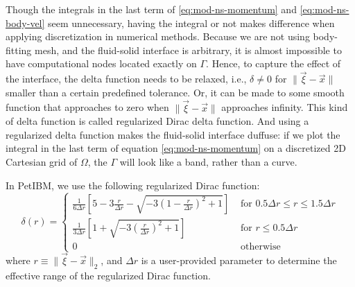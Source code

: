 Though the integrals in the last term of \eqref{eq:mod-ns-momentum} and \eqref{eq:mod-ns-body-vel} seem unnecessary, having the integral or not makes difference when applying discretization in numerical methods.
Because we are not using body-fitting mesh, and the fluid-solid interface is arbitrary, it is almost impossible to have computational nodes located exactly on $\Gamma$.
Hence, to capture the effect of the interface, the delta function needs to be relaxed, i.e., $\delta \ne 0$ for $\lVert \vec{\xi}-\vec{x} \rVert$ smaller than a certain predefined tolerance.
Or, it can be made to some smooth function that approaches to zero when $\lVert \vec{\xi}-\vec{x} \rVert$ approaches infinity.
This kind of delta function is called regularized Dirac delta function.
And using a regularized delta function makes the fluid-solid interface duffuse: if we plot the integral in the last term of equation \eqref{eq:mod-ns-momentum} on a discretized 2D Cartesian grid of $\Omega$, the $\Gamma$ will look like a band, rather than a curve.

In PetIBM, we use the following regularized Dirac function:
\begin{equation}\label{eq:regularized-dirac}
    \delta\left(r\right)=\left\{
        \begin{array}{ll}
            \frac{1}{6 \Delta r}\left[
                5-3 \frac{r}{\Delta r}-\sqrt{-3\left(1-\frac{r}{\Delta r}\right)^{2}+1}
            \right] & \text { for } 0.5 \Delta r \le r \le 1.5 \Delta r \\
            \frac{1}{3 \Delta r}\left[
                1+\sqrt{-3\left(\frac{r}{\Delta r}\right)^{2}+1}
            \right] & \text { for }r \le 0.5 \Delta r \\
            0 & \text { otherwise }
        \end{array}
    \right.
\end{equation}
where $r \equiv \lVert\vec{\xi}-\vec{x}\rVert_2$, and $\Delta r$ is a user-provided parameter to determine the effective range of the regularized Dirac function.

